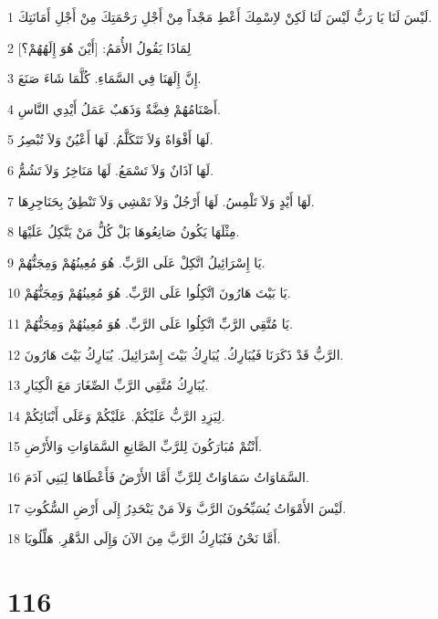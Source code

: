 \par 1 لَيْسَ لَنَا يَا رَبُّ لَيْسَ لَنَا لَكِنْ لاِسْمِكَ أَعْطِ مَجْداً مِنْ أَجْلِ رَحْمَتِكَ مِنْ أَجْلِ أَمَانَتِكَ.
\par 2 لِمَاذَا يَقُولُ الأُمَمُ: [أَيْنَ هُوَ إِلَهُهُمْ؟]
\par 3 إِنَّ إِلَهَنَا فِي السَّمَاءِ. كُلَّمَا شَاءَ صَنَعَ.
\par 4 أَصْنَامُهُمْ فِضَّةٌ وَذَهَبٌ عَمَلُ أَيْدِي النَّاسِ.
\par 5 لَهَا أَفْوَاهٌ وَلاَ تَتَكَلَّمُ. لَهَا أَعْيُنٌ وَلاَ تُبْصِرُ.
\par 6 لَهَا آذَانٌ وَلاَ تَسْمَعُ. لَهَا مَنَاخِرُ وَلاَ تَشُمُّ.
\par 7 لَهَا أَيْدٍ وَلاَ تَلْمِسُ. لَهَا أَرْجُلٌ وَلاَ تَمْشِي وَلاَ تَنْطِقُ بِحَنَاجِرِهَا.
\par 8 مِثْلَهَا يَكُونُ صَانِعُوهَا بَلْ كُلُّ مَنْ يَتَّكِلُ عَلَيْهَا.
\par 9 يَا إِسْرَائِيلُ اتَّكِلْ عَلَى الرَّبِّ. هُوَ مُعِينُهُمْ وَمِجَنُّهُمْ.
\par 10 يَا بَيْتَ هَارُونَ اتَّكِلُوا عَلَى الرَّبِّ. هُوَ مُعِينُهُمْ وَمِجَنُّهُمْ.
\par 11 يَا مُتَّقِي الرَّبِّ اتَّكِلُوا عَلَى الرَّبِّ. هُوَ مُعِينُهُمْ وَمِجَنُّهُمْ.
\par 12 الرَّبُّ قَدْ ذَكَرَنَا فَيُبَارِكُ. يُبَارِكُ بَيْتَ إِسْرَائِيلَ. يُبَارِكُ بَيْتَ هَارُونَ.
\par 13 يُبَارِكُ مُتَّقِي الرَّبِّ الصِّغَارَ مَعَ الْكِبَارِ.
\par 14 لِيَزِدِ الرَّبُّ عَلَيْكُمْ. عَلَيْكُمْ وَعَلَى أَبْنَائِكُمْ.
\par 15 أَنْتُمْ مُبَارَكُونَ لِلرَّبِّ الصَّانِعِ السَّمَاوَاتِ وَالأَرْضِ.
\par 16 السَّمَاوَاتُ سَمَاوَاتٌ لِلرَّبِّ أَمَّا الأَرْضُ فَأَعْطَاهَا لِبَنِي آدَمَ.
\par 17 لَيْسَ الأَمْوَاتُ يُسَبِّحُونَ الرَّبَّ وَلاَ مَنْ يَنْحَدِرُ إِلَى أَرْضِ السُّكُوتِ.
\par 18 أَمَّا نَحْنُ فَنُبَارِكُ الرَّبَّ مِنَ الآنَ وَإِلَى الدَّهْرِ. هَلِّلُويَا.

\chapter{116}

